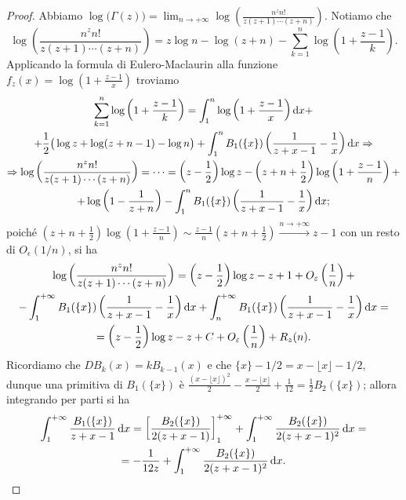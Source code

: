 \begin{proof}
  Abbiamo $\displaystyle \log\big(\Gamma(z)\big)=\lim_{n \longrightarrow +\infty} \log\left(\frac{n^zn!}{z(z+1)\cdots(z+n)}\right)$. Notiamo che
  $$\log\left(\frac{n^zn!}{z(z+1)\cdots(z+n)}\right)=z\log{n}-\log(z+n)-\sum_{k=1}^n \log\left(1+\frac{z-1}{k}\right).$$
  Applicando la formula di Eulero-Maclaurin alla funzione $f_z(x)=\log\left(1+\frac{z-1}{x}\right)$ troviamo
  \begin{gather*}
    \sum_{k=1}^n \log\left(1+\frac{z-1}{k}\right)=\int_1^n \log\left(1+\frac{z-1}{x}\right)\mathop{}\!\mathrm{d} x+\\
    +\frac{1}{2}\big(\log{z}+\log(z+n-1)-\log{n}\big)+\int_1^n B_1(\{x\})\left(\frac{1}{z+x-1}-\frac{1}{x}\right)\mathop{}\!\mathrm{d} x \Rightarrow \\
    \Rightarrow \log\left(\frac{n^zn!}{z(z+1)\cdots(z+n)}\right)=\dots=\left(z-\frac{1}{2}\right)\log{z}-\left(z+n+\frac{1}{2}\right)\log\left(1+\frac{z-1}{n}\right)+\\
    +\log\left(1-\frac{1}{z+n}\right)-\int_1^n B_1(\{x\})\left(\frac{1}{z+x-1}-\frac{1}{x}\right)\mathop{}\!\mathrm{d} x;
  \end{gather*}
  poiché $\displaystyle \left(z+n+\frac{1}{2}\right)\log\left(1+\frac{z-1}{n}\right) \sim \frac{z-1}{n}\left(z+n+\frac{1}{2}\right) \overset{n \rightarrow +\infty}{\longrightarrow} z-1$ con un resto di $O_{\epsilon}(1/n)$, si ha
  \begin{gather*}
    \log\left(\frac{n^zn!}{z(z+1)\cdots(z+n)}\right)=\left(z-\frac{1}{2}\right)\log{z}-z+1+O_{\varepsilon}\left(\frac{1}{n}\right)+\\
    -\int_1^{+\infty} B_1(\{x\})\left(\frac{1}{z+x-1}-\frac{1}{x}\right)\mathop{}\!\mathrm{d} x+\int_n^{+\infty}B_1(\{x\})\left(\frac{1}{z+x-1}-\frac{1}{x}\right)\mathop{}\!\mathrm{d} x=\\
    =\left(z-\frac{1}{2}\right)\log{z}-z+C+O_{\varepsilon}\left(\frac{1}{n}\right)+R_z(n).
  \end{gather*}
  Ricordiamo che $DB_k(x)=kB_{k-1}(x)$ e che $\{x\}-1/2=x-\lfloor x\rfloor-1/2$, dunque una primitiva di $B_1(\{x\})$ è $\frac{(x-\lfloor x\rfloor)^2}{2}-\frac{x-\lfloor x\rfloor}{2}+\frac{1}{12}=\frac{1}{2}B_2(\{x\})$; allora integrando per parti si ha
  \begin{gather*}
    \int_1^{+\infty} \frac{B_1(\{x\})}{z+x-1}\mathop{}\!\mathrm{d} x=\left[\frac{B_2(\{x\})}{2(z+x-1)}\right]_1^{+\infty}+\int_1^{+\infty} \frac{B_2(\{x\})}{2(z+x-1)^2}\mathop{}\!\mathrm{d} x=\\
    =-\frac{1}{12z}+\int_1^{+\infty} \frac{B_2(\{x\})}{2(z+x-1)^2}\mathop{}\!\mathrm{d} x.
  \end{gather*}

\end{proof}
